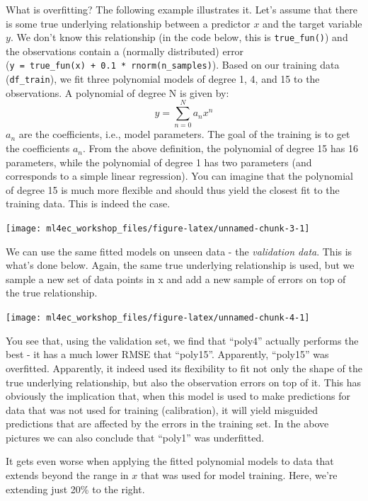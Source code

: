 \documentclass[
]{book}
\begin{document}
What is overfitting? The following example illustrates it. Let's assume that there is some true underlying relationship between a predictor \(x\) and the target variable \(y\). We don't know this relationship (in the code below, this is \texttt{true\_fun()}) and the observations contain a (normally distributed) error (\texttt{y\ =\ true\_fun(x)\ +\ 0.1\ *\ rnorm(n\_samples)}). Based on our training data (\texttt{df\_train}), we fit three polynomial models of degree 1, 4, and 15 to the observations. A polynomial of degree N is given by: \[
y = \sum_{n=0}^N a_n x^n
\] \(a_n\) are the coefficients, i.e., model parameters. The goal of the training is to get the coefficients \(a_n\). From the above definition, the polynomial of degree 15 has 16 parameters, while the polynomial of degree 1 has two parameters (and corresponds to a simple linear regression). You can imagine that the polynomial of degree 15 is much more flexible and should thus yield the closest fit to the training data. This is indeed the case.

\begin{center}\texttt{[image: ml4ec\_workshop\_files/figure-latex/unnamed-chunk-3-1]} \end{center}

We can use the same fitted models on unseen data - the \emph{validation data}. This is what's done below. Again, the same true underlying relationship is used, but we sample a new set of data points in x and add a new sample of errors on top of the true relationship.

\begin{center}\texttt{[image: ml4ec\_workshop\_files/figure-latex/unnamed-chunk-4-1]} \end{center}

You see that, using the validation set, we find that ``poly4'' actually performs the best - it has a much lower RMSE that ``poly15''. Apparently, ``poly15'' was overfitted. Apparently, it indeed used its flexibility to fit not only the shape of the true underlying relationship, but also the observation errors on top of it. This has obviously the implication that, when this model is used to make predictions for data that was not used for training (calibration), it will yield misguided predictions that are affected by the errors in the training set. In the above pictures we can also conclude that ``poly1'' was underfitted.

It gets even worse when applying the fitted polynomial models to data that extends beyond the range in \(x\) that was used for model training. Here, we're extending just 20\% to the right.
\end{document}
